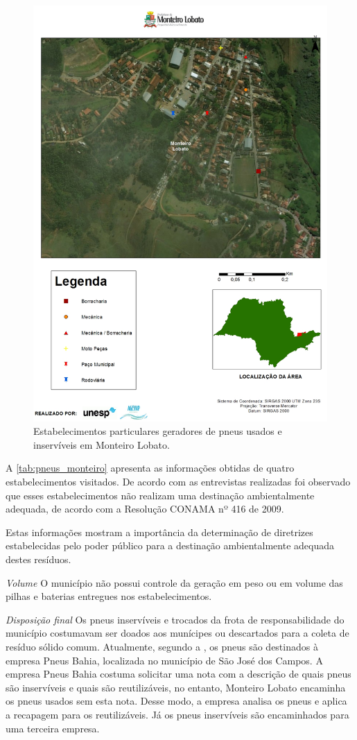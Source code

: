 \begin{description}
		\begin{figure}
			\centering
			\includegraphics[width=0.75\linewidth]{produtos/prodtres/image092}
			\caption{Estabelecimentos particulares geradores de pneus usados e inservíveis em Monteiro Lobato.}
			\label{fig:image092}
		\end{figure}
		
	
		A \autoref{tab:pneus_monteiro} apresenta as informações obtidas de quatro estabelecimentos visitados. De acordo com as entrevistas realizadas foi observado que esses estabelecimentos não realizam uma destinação ambientalmente adequada, de acordo com a Resolução CONAMA nº 416 de 2009.
	
		
	
		Estas informações mostram a importância da determinação de diretrizes estabelecidas pelo poder público para a destinação ambientalmente adequada destes resíduos.
	
	\subitem \textit{Volume}
	O município não possui controle da geração em peso ou em volume das pilhas e baterias entregues nos estabelecimentos.
	
	\subitem \textit{Disposição final}
	Os pneus inservíveis e trocados da frota de responsabilidade do município costumavam ser doados aos munícipes ou descartados para a coleta de resíduo sólido comum. Atualmente, segundo a , os pneus são destinados à empresa Pneus Bahia, localizada no município de São José dos Campos. A empresa Pneus Bahia costuma solicitar uma nota com a descrição de quais pneus são inservíveis e quais são reutilizáveis, no entanto, Monteiro Lobato encaminha os pneus usados sem esta nota. Desse modo, a empresa analisa os pneus e aplica a recapagem para os reutilizáveis. Já os pneus inservíveis são encaminhados para uma terceira empresa.
	

\end{description}
